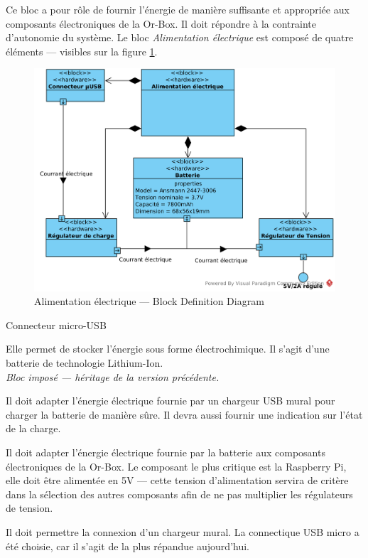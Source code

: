 Ce bloc a pour rôle de fournir l'énergie de manière suffisante et appropriée aux composants électroniques de la Or-Box.
Il doit répondre à la contrainte d'autonomie du système.
Le bloc \emph{Alimentation électrique} est composé de quatre éléments --- visibles sur la figure \ref{AlimBDD}.

\begin{figure}[H]
	\centerline{
		\includegraphics[scale=0.75]{img/SysML_Alim_BDD.png}
	}
	\caption{Alimentation électrique --- Block Definition Diagram}
	\label{AlimBDD}
\end{figure}

\begin{labeling}[~--]{Connecteur micro-USB}
	\item [Batterie]
	Elle permet de stocker l'énergie sous forme électrochimique.
	Il s'agit d'une batterie de technologie Lithium-Ion.
	\\ \emph{Bloc imposé --- héritage de la version précédente.}
	\item [Régulateur de charge]
	Il doit adapter l'énergie électrique fournie par un chargeur USB mural pour charger la batterie de manière sûre.
	Il devra aussi fournir une indication sur l'état de la charge.
	\item [Régulateur de tension]
	Il doit adapter l'énergie électrique fournie par la batterie aux composants électroniques de la Or-Box.
	Le composant le plus critique est la Raspberry Pi, elle doit être alimentée en 5V --- cette tension d'alimentation servira de critère dans la sélection des autres composants afin de ne pas multiplier les régulateurs de tension.
	\item [Connecteur micro-USB]
	Il doit permettre la connexion d'un chargeur mural.
	La connectique USB micro a été choisie, car il s'agit de la plus répandue aujourd'hui.
\end{labeling}


